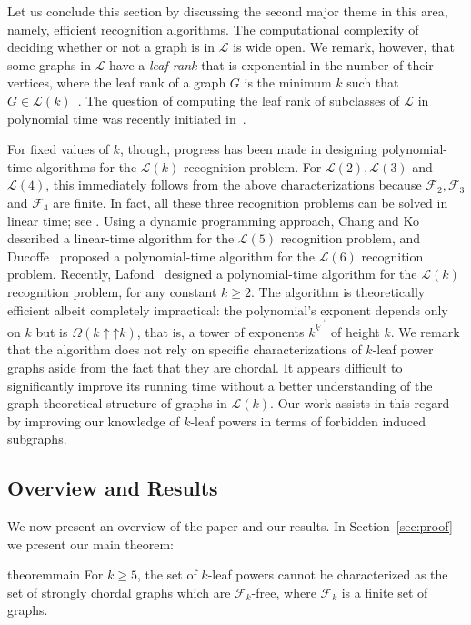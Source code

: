 \documentclass[11pt,letter]{article}
\theoremstyle{remark}
\newcommand{\binuparrow}{\mathbin{\uparrow}}
\newcommand{\F}{\mathscr{F}}
\renewcommand{\L}{\mathcal{L}}
\def\rddots#1{\cdot^{\cdot^{\cdot^{#1}}}}
\begin{document}
Let us conclude this section by discussing the second major theme
in this area, namely, efficient recognition algorithms.
The computational complexity of deciding whether or not a graph is in $\L$ is wide open.  
We remark, however, that some graphs in $\L$ have a {\em leaf rank} that is exponential in the number of their vertices, where the leaf rank of a graph $G$ is the minimum $k$ such that $G \in \L(k)$~\cite{LowerBoundsLR}.  The question of computing the leaf rank of subclasses of $\L$ in polynomial time was recently initiated in~\cite{le2023computing}.

For fixed values of $k$, though, progress has been made in designing polynomial-time algorithms for the $\L(k)$ recognition problem.  For $\L(2), \L(3)$ and $\L(4)$, this immediately follows from the above characterizations because $\F_2, \F_3$ and $\F_4$ are finite. 
In fact, all these three recognition problems can be solved in linear time; see \cite{BRANDSTADT2006,Brandstadt2008-4LP}.
Using a dynamic programming approach, Chang and Ko~\cite{Chang2007} described a linear-time algorithm for the $\L(5)$ recognition problem, and Ducoffe~\cite{ducoffe20194} proposed a polynomial-time algorithm for the $\L(6)$ recognition problem. Recently, Lafond~\cite{Lafond2023} designed a polynomial-time algorithm for the $\L(k)$ recognition problem, for any constant $k \geq 2$. 
The algorithm is theoretically efficient albeit completely impractical: the polynomial's exponent depends only on $k$ but is $\Omega(k \binuparrow\binuparrow k)$, that is, a tower of exponents $k^{k^{\rddots k}}$ of height $k$.  
We remark that the algorithm 
does not rely on specific characterizations of $k$-leaf power graphs aside from the fact that they are chordal. It appears difficult to significantly improve its running time without a better understanding of the graph theoretical structure of graphs in $\L(k)$.  Our work assists in this regard by improving our knowledge of $k$-leaf powers in terms of forbidden induced subgraphs.




\subsection{Overview and Results}
We now present an overview of the paper and our results.
In Section~\ref{sec:proof} we present our main theorem:
\begin{restatable}{theorem}{main}\label{thm:main}
    For $k\geq 5$, the set of $k$-leaf powers cannot be characterized as the set of strongly chordal graphs which are $\F_k$-free, where $\F_k$ is a finite set of graphs.
\end{restatable}
\end{document}
